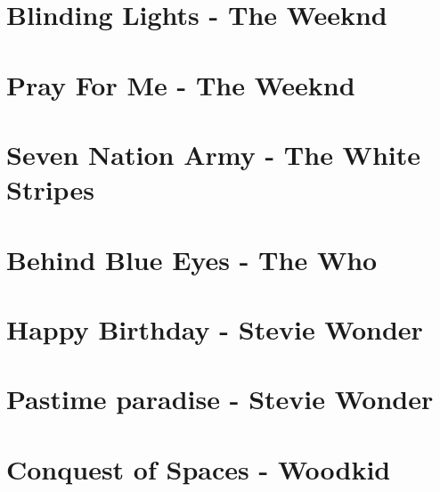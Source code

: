 \documentclass[11pt]{article}
\begin{document}
\section{Blinding Lights - The Weeknd}
\begin{guitar}

\end{guitar}

\section{Pray For Me - The Weeknd}
\begin{guitar}

\end{guitar}

\section{Seven Nation Army - The White Stripes}



\section{Behind Blue Eyes - The Who}
\begin{guitar}

\end{guitar}

\section{Happy Birthday - Stevie Wonder}
\begin{guitar}

\end{guitar}



\section{Pastime paradise - Stevie Wonder}
\begin{guitar}

\end{guitar}





\section{Conquest of Spaces - Woodkid}
\begin{guitar}

\end{guitar}
\end{document}
